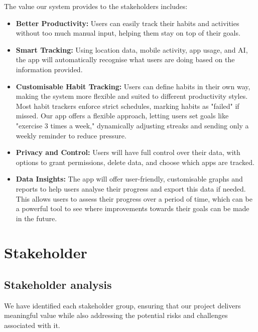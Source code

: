 The value our system provides to the stakeholders includes:

\begin{itemize}
    \item \textbf{Better Productivity:} Users can easily track their habits and activities without too much manual input, helping them stay on top of their goals.
    
    \item \textbf{Smart Tracking:} Using location data, mobile activity, app usage, and AI, the app will automatically recognise what users are doing based on the information provided.

    \item \textbf{Customisable Habit Tracking:} Users can define habits in their own way, making the system more flexible and suited to different productivity styles. Most habit trackers enforce strict schedules, marking habits as "failed" if missed. Our app offers a flexible approach, letting users set goals like "exercise 3 times a week," dynamically adjusting streaks and sending only a weekly reminder to reduce pressure.

    \item \textbf{Privacy and Control:} Users will have full control over their data, with options to grant permissions, delete data, and choose which apps are tracked.

    \item \textbf{Data Insights:} The app will offer user-friendly, customisable graphs and reports to help users analyse their progress and export this data if needed. This allows users to assess their progress over a period of time, which can be a powerful tool to see where improvements towards their goals can be made in the future.
\end{itemize}

\section{Stakeholder}
\label{sect:stakeholder}

\subsection{Stakeholder analysis}
We have identified each stakeholder group, ensuring that our project delivers meaningful value while also addressing the potential risks and challenges associated with it.

